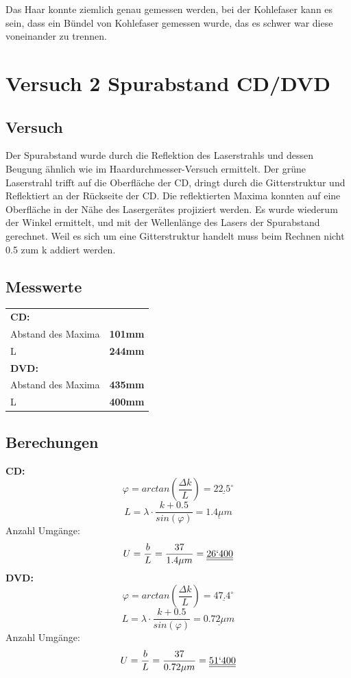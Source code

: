 \documentclass{article}
\begin{document}
Das Haar konnte ziemlich genau gemessen werden, bei der Kohlefaser kann es sein, dass ein Bündel
von Kohlefaser gemessen wurde, das es schwer war diese voneinander zu trennen.
\section{Versuch 2 Spurabstand CD/DVD}
\subsection{Versuch}
Der Spurabstand wurde durch die Reflektion des Laserstrahls und dessen Beugung ähnlich wie im
Haardurchmesser-Versuch ermittelt. Der grüne Laserstrahl trifft auf die Oberfläche der CD, dringt
durch die Gitterstruktur und Reflektiert an der Rückseite der CD. Die reflektierten Maxima konnten auf
eine Oberfläche in der Nähe des Lasergerätes projiziert werden. Es wurde wiederum der Winkel ermittelt,
und mit der Wellenlänge des Lasers der Spurabstand gerechnet. Weil es sich um eine Gitterstruktur
handelt muss beim Rechnen nicht 0.5 zum k addiert werden.
\subsection{Messwerte}
\begin{tabular}{l r}
	\textbf{CD:}&\\
Abstand des Maxima& \textbf{101mm}\\
L & \textbf{244mm}\\
	\textbf{DVD:}&\\
Abstand des Maxima& \textbf{435mm}\\
L & \textbf{400mm}
\end{tabular}
\subsection{Berechungen}
\textbf{CD:}
\begin{equation}
\varphi = arctan(\frac{\Delta k}{L}) =\underline{22.5^\circ}
\end{equation}
\begin{equation}
L = \lambda \cdot \frac{k+0.5}{sin(\varphi)}= \underline{1.4\mu m} 
\end{equation}
Anzahl Umgänge:
\begin{equation}
U = \frac{b}{L}=\frac{37}{1.4\mu m}= \underline{\underline{26`400}}
\end{equation}
\textbf{DVD:}
\begin{equation}
\varphi = arctan(\frac{\Delta k}{L}) =\underline{47.4^\circ}
\end{equation}
\begin{equation}
L = \lambda \cdot \frac{k+0.5}{sin(\varphi)}= \underline{0.72\mu m} 
\end{equation}
Anzahl Umgänge:
\begin{equation}
U = \frac{b}{L}=\frac{37}{0.72\mu m}= \underline{\underline{51`400}}
\end{equation}
\end{document}
